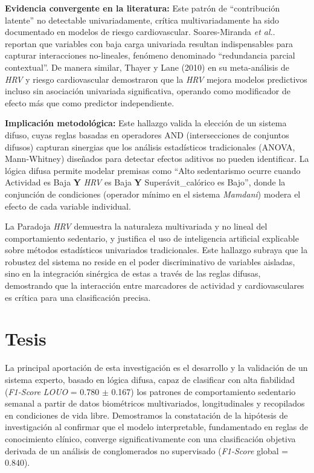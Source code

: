 \textbf{Evidencia convergente en la literatura:} Este patrón de ``contribución latente'' no detectable univariadamente, crítica multivariadamente ha sido documentado en modelos de riesgo cardiovascular. Soares-Miranda \textit{et al.}. \cite{Soares-Miranda2014} reportan que variables con baja carga univariada resultan indispensables para capturar interacciones no-lineales, fenómeno denominado ``redundancia parcial contextual''. De manera similar, Thayer y Lane (2010) en su meta-análisis de \textit{HRV} y riesgo cardiovascular demostraron que la \textit{HRV} mejora modelos predictivos incluso sin asociación univariada significativa, operando como modificador de efecto más que como predictor independiente.

\textbf{Implicación metodológica:} Este hallazgo valida la elección de un sistema difuso, cuyas reglas basadas en operadores AND (intersecciones de conjuntos difusos) capturan sinergias que los análisis estadísticos tradicionales (ANOVA, Mann-Whitney) diseñados para detectar efectos aditivos no pueden identificar. La lógica difusa permite modelar premisas como ``Alto sedentarismo ocurre cuando Actividad es Baja \textbf{Y} \textit{HRV} es Baja \textbf{Y} Superávit\_calórico es Bajo'', donde la conjunción de condiciones (operador mínimo en el sistema \textit{Mamdani}) modera el efecto de cada variable individual.

La Paradoja \textit{HRV} demuestra la naturaleza multivariada y no lineal del comportamiento sedentario, y justifica el uso de inteligencia artificial explicable sobre métodos estadísticos univariados tradicionales. Este hallazgo subraya que la robustez del sistema no reside en el poder discriminativo de variables aisladas, sino en la integración sinérgica de estas a través de las reglas difusas, demostrando que la interacción entre marcadores de actividad y cardiovasculares es crítica para una clasificación precisa.

\section{Tesis}
\label{sec:tesis}

La principal aportación de esta investigación es el desarrollo y la validación de un sistema experto, basado en lógica difusa, capaz de clasificar con alta fiabilidad (\textit{F1-Score} \textit{LOUO} = 0.780 $\pm$ 0.167) los patrones de comportamiento sedentario semanal a partir de datos biométricos multivariados, longitudinales y recopilados en condiciones de vida libre. Demostramos la constatación de la hipótesis de investigación al confirmar que el modelo interpretable, fundamentado en reglas de conocimiento clínico, converge significativamente con una clasificación objetiva derivada de un análisis de conglomerados no supervisado (\textit{F1-Score} global = 0.840).


